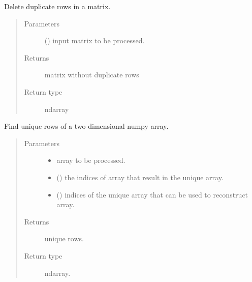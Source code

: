 \documentclass[letterpaper,10pt,english]{sphinxmanual}
\begin{document}
\begin{fulllineitems}
\label{\detokenize{petgem/vectors:petgem.vectors.deleteDuplicateRows}}
Delete duplicate rows in a matrix.
\begin{quote}\begin{description}
\item[{Parameters}] \leavevmode
{} () \textendash{} input matrix to be processed.

\item[{Returns}] \leavevmode
matrix without duplicate rows

\item[{Return type}] \leavevmode
ndarray

\end{description}\end{quote}

\end{fulllineitems}


\begin{fulllineitems}
\label{\detokenize{petgem/vectors:petgem.vectors.findUniqueRows}}
Find unique rows of a two-dimensional numpy array.
\begin{quote}\begin{description}
\item[{Parameters}] \leavevmode\begin{itemize}
\item {} 
 \textendash{} array to be processed.

\item {} 
 () \textendash{} the indices of array that result in the
unique array.

\item {} 
 () \textendash{} indices of the unique array that
can be used to reconstruct array.

\end{itemize}

\item[{Returns}] \leavevmode
unique rows.

\item[{Return type}] \leavevmode
ndarray.

\end{description}\end{quote}

\end{fulllineitems}
\end{document}
